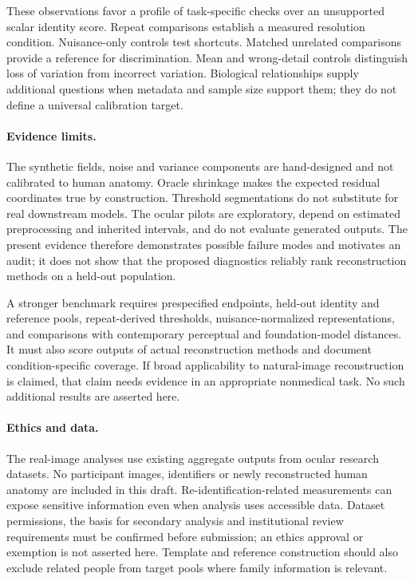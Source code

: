 \documentclass[10pt,twocolumn,letterpaper]{article}
\begin{document}
These observations favor a profile of task-specific checks over an unsupported scalar identity score. Repeat comparisons establish a measured resolution condition. Nuisance-only controls test shortcuts. Matched unrelated comparisons provide a reference for discrimination. Mean and wrong-detail controls distinguish loss of variation from incorrect variation. Biological relationships supply additional questions when metadata and sample size support them; they do not define a universal calibration target.

\paragraph{Evidence limits.}
The synthetic fields, noise and variance components are hand-designed and not calibrated to human anatomy. Oracle shrinkage makes the expected residual coordinates true by construction. Threshold segmentations do not substitute for real downstream models. The ocular pilots are exploratory, depend on estimated preprocessing and inherited intervals, and do not evaluate generated outputs. The present evidence therefore demonstrates possible failure modes and motivates an audit; it does not show that the proposed diagnostics reliably rank reconstruction methods on a held-out population.

A stronger benchmark requires prespecified endpoints, held-out identity and reference pools, repeat-derived thresholds, nuisance-normalized representations, and comparisons with contemporary perceptual and foundation-model distances. It must also score outputs of actual reconstruction methods and document condition-specific coverage. If broad applicability to natural-image reconstruction is claimed, that claim needs evidence in an appropriate nonmedical task. No such additional results are asserted here.

\paragraph{Ethics and data.}
The real-image analyses use existing aggregate outputs from ocular research datasets. No participant images, identifiers or newly reconstructed human anatomy are included in this draft. Re-identification-related measurements can expose sensitive information even when analysis uses accessible data. Dataset permissions, the basis for secondary analysis and institutional review requirements must be confirmed before submission; an ethics approval or exemption is not asserted here. Template and reference construction should also exclude related people from target pools where family information is relevant.
\end{document}
